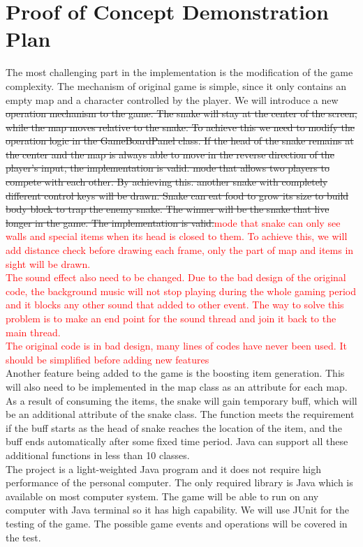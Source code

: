 \documentclass{article}
\begin{document}
\section{Proof of Concept Demonstration Plan}
    The most challenging part in the implementation is the modification of the game complexity. The mechanism of original game is simple, since it only contains an empty map and a character controlled by the player. We will introduce a new \sout{operation mechanism to the game. The snake will stay at the center of the screen, while the map moves relative to the snake. To achieve this we need to modify the operation logic in the GameBoardPanel class. If the head of the snake remains at the center and the map is always able to move in the reverse direction of the player's input, the implementation is valid. mode that allows two players to compete with each other. By achieving this. another snake with completely different control keys will be drawn. Snake can eat food to grow its size to build body block to trap the enemy snake. The winner will be the snake that live longer in the game. The implementation is valid.}\textcolor{red}{mode that snake can only see walls and special items when its head is closed to them. To achieve this, we will add distance check before drawing each frame, only the part of map and items in sight will be drawn.}\\
    \textcolor{red}{The sound effect also need to be changed. Due to the bad design of the original code, the background music will not stop playing during the whole gaming period and it blocks any other sound that added to other event. The way to solve this problem is to make an end point for the sound thread and join it back to the main thread.}\\
    \textcolor{red}{The original code is in bad design, many lines of codes have never been used. It should be simplified before adding new features}\\
    Another feature being added to the game is the boosting item generation. This will also need to be implemented in the map class as an attribute for each map. As a result of consuming the items, the snake will gain temporary buff, which will be an additional attribute of the snake class. The function meets the requirement if the buff starts as the head of snake reaches the location of the item, and the buff ends automatically after some fixed time period. Java can support all these additional functions in less than 10 classes. \\
    The project is a light-weighted Java program and it does not require high performance of the personal computer. The only required library is Java which is available on most computer system. The game will be able to run on any computer with Java terminal so it has high capability. We will use JUnit for the testing of the game. The possible game events and operations will be covered in the test.
\end{document}
